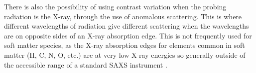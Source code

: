 There is also the possibility of using contrast variation when the probing radiation is the X-ray, through the use of anomalous scattering.
This is where different wavelengths of radiation give different scattering when the wavelengths are on opposite sides of an X-ray absorption edge.
This is not frequently used for soft matter species, as the X-ray absorption edges for elements common in soft matter (H, C, N, O, etc.) are at very low X-ray energies so generally outside of the accessible range of a standard SAXS instrument \cite{schurtenberger_contrast_2002}.
